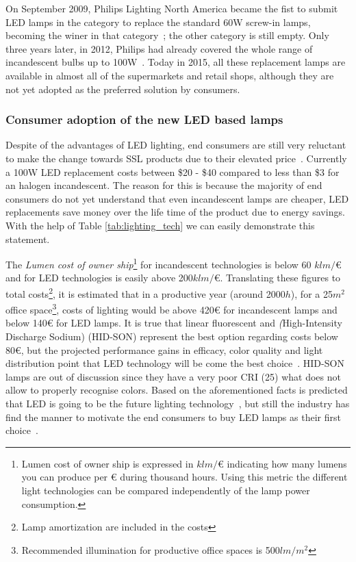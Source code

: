 On September 2009, Philips Lighting North America became the fist to submit LED lamps in the category to replace the standard 60W screw-in lamps, becoming the winer in that category~\cite{web:Winer-LPrize,web:Wright}; the other category is still empty. Only three years later, in 2012, Philips had already covered the whole range of incandescent bulbs up to 100W~\cite{13liedenbaum}. Today in 2015, all these replacement lamps are available in almost all of the supermarkets and retail shops, although they are not yet adopted as the preferred solution by consumers.

\subsubsection{Consumer adoption of the new LED based lamps}
Despite of the advantages of LED lighting, end consumers are still very reluctant to make the change towards SSL products due to their elevated price~\cite{11Voger,15Greig}. Currently a 100W LED replacement costs between \$20 - \$40 compared to less than \$3 for an halogen incandescent. The reason for this is because the majority of end consumers do not yet understand that even incandescent lamps are cheaper, LED replacements save money over the life time of the product due to energy savings. With the help of Table \ref{tab:lighting_tech} we can easily demonstrate this  statement.

The \emph{Lumen cost of owner ship}\footnote{Lumen cost of owner ship is expressed in $klm/$€ indicating how many lumens you can produce per € during thousand hours. Using this metric the different light technologies can be compared independently of the lamp power consumption.} for incandescent technologies is below 60 $klm/$€ and for LED technologies is easily above 200$klm/$€. Translating these figures to total costs\footnote{Lamp amortization are included in the costs}, it is estimated that in a productive year (around 2000$h$), for a 25$ m^2 $  office space\footnote{Recommended illumination for productive office spaces is 500$ lm/m^2 $}, costs of lighting would be above 420€ for incandescent lamps and below 140€ for LED lamps. It is true that linear fluorescent and \emph(High-Intensity Discharge Sodium) (HID-SON) represent the best option regarding costs below 80€, but the projected performance gains in efficacy, color quality and light distribution point that LED technology will be come the best choice~\cite{14Braga}. HID-SON lamps are out of discussion since they  have a very poor CRI (25) what does not allow to properly recognise colors. Based on the aforementioned facts is predicted that LED is going to be the future lighting technology~\cite{13Uken,14USDoE}, but still the industry has find the manner to motivate the end consumers to buy LED lamps as their first choice~\cite{11Voger}.


